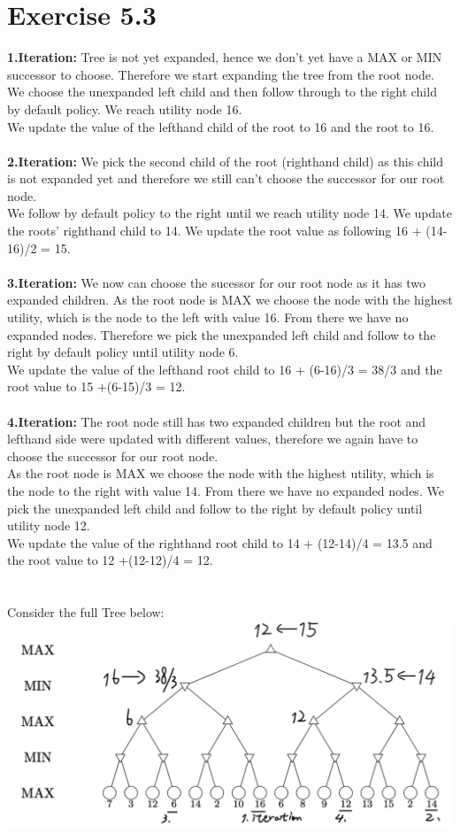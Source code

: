 \documentclass[12pt]{article}
\begin{document}
\section*{Exercise 5.3}
\textbf{1.Iteration:} Tree is not yet expanded, hence we don't yet have a MAX or MIN successor to choose. Therefore we start expanding the tree from the root node. \\
We choose the unexpanded left child and then follow through to the right child by default policy. We reach utility node 16.\\
We update the value of the lefthand child of the root to 16 and the root to 16.\\
\\
\textbf{2.Iteration:} We pick the second child of the root (righthand child) as this child is not expanded yet and therefore we still can't choose the successor for our root node. \\ 
We follow by default policy to the right until we reach utility node 14. We update the roots' righthand child to 14. We update the root value as following 16 + (14-16)/2 = 15.\\
\\
\textbf{3.Iteration:} We now can choose the sucessor for our root node as it has two expanded children. As the root node is MAX we choose the node with the highest utility, which is the node to the left with value 16. From there we have no expanded nodes. Therefore we pick the unexpanded left child and follow to the right by default policy until utility node 6.\\
We update the value of the lefthand root child to 16 + (6-16)/3 = 38/3 and the root value to 15 +(6-15)/3 = 12.\\
\\
\textbf{4.Iteration:} The root node still has two expanded children but the root and lefthand side were updated with different values, therefore we again have to choose the successor for our root node.\\
As the root node is MAX we choose the node with the highest utility, which is the node to the right with value 14. From there we have no expanded nodes. We pick the unexpanded left child and follow to the right by default policy until utility node 12.\\
We update the value of the righthand root child to 14 + (12-14)/4 = 13.5 and the root value to 12 +(12-12)/4 = 12.\\
\\ \\
Consider the full Tree below: \\
\includegraphics[width=\textwidth]{figures/5.3.png}\\
\end{document}
